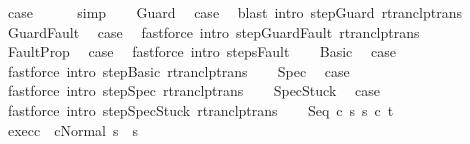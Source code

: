 \begin{isabellebody}
\ {\isacharquery}case\isanewline
\ \ \ \ \isamarkupfalse%
\ simp\isanewline
{}\isamarkupfalse%
\isanewline
\ \ \isamarkupfalse%
\ Guard\ \isamarkupfalse%
\ {\isacharquery}case\ \isamarkupfalse%
\ {\isacharparenleft}blast\ intro{\isacharcolon}\ step{\isachardot}Guard\ rtranclp{\isacharunderscore}trans{\isacharparenright}\isanewline
{}\isamarkupfalse%
\isanewline
\ \ \isamarkupfalse%
\ GuardFault\ \isamarkupfalse%
\ {\isacharquery}case\ \isamarkupfalse%
\ {\isacharparenleft}fastforce\ intro{\isacharcolon}\ step{\isachardot}GuardFault\ rtranclp{\isacharunderscore}trans{\isacharparenright}\isanewline
{}\isamarkupfalse%
\isanewline
\ \ \isamarkupfalse%
\ FaultProp\ \isamarkupfalse%
\ {\isacharquery}case\ \isamarkupfalse%
\ {\isacharparenleft}fastforce\ intro{\isacharcolon}\ steps{\isacharunderscore}Fault{\isacharparenright}\isanewline
{}\isamarkupfalse%
\isanewline
\ \ \isamarkupfalse%
\ Basic\ \isamarkupfalse%
\ {\isacharquery}case\ \isamarkupfalse%
\ {\isacharparenleft}fastforce\ intro{\isacharcolon}\ step{\isachardot}Basic\ rtranclp{\isacharunderscore}trans{\isacharparenright}\isanewline
{}\isamarkupfalse%
\isanewline
\ \ \isamarkupfalse%
\ Spec\ \isamarkupfalse%
\ {\isacharquery}case\ \isamarkupfalse%
\ {\isacharparenleft}fastforce\ intro{\isacharcolon}\ step{\isachardot}Spec\ rtranclp{\isacharunderscore}trans{\isacharparenright}\isanewline
{}\isamarkupfalse%
\isanewline
\ \ \isamarkupfalse%
\ SpecStuck\ \isamarkupfalse%
\ {\isacharquery}case\ \isamarkupfalse%
\ {\isacharparenleft}fastforce\ intro{\isacharcolon}\ step{\isachardot}SpecStuck\ rtranclp{\isacharunderscore}trans{\isacharparenright}\isanewline
{}\isamarkupfalse%
\isanewline
\ \ \isamarkupfalse%
\ {\isacharparenleft}Seq\ c\ s\ s{\isacharprime}\ c\ t{\isacharparenright}\ \isanewline
\ \ \isamarkupfalse%
\ exec{\isacharunderscore}c\ {\isachardoublequoteopen}{\isasymGamma}{\isasymturnstile}\ {\isasymlangle}cNormal\ s{\isasymrangle}\ {\isasymRightarrow}\ s{\isacharprime}{\isachardoublequoteclose}\ \isamarkupfalse%

\end{isabellebody}
